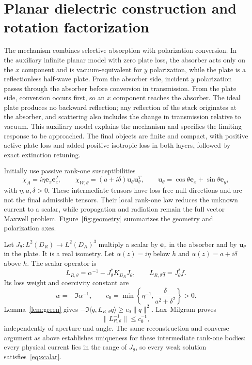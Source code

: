 \documentclass[11pt]{article}
\newcommand{\ey}{\mathbf e_y}
\newcommand{\ex}{\mathbf e_x}
\newcommand{\uvec}{\mathbf u_\theta}
\newcommand{\ip}[2]{\langle #1,#2\rangle}
\newcommand{\norm}[1]{\lVert #1\rVert}
\begin{document}
\section{Planar dielectric construction and rotation factorization}\label{sec:planar}
The mechanism combines selective absorption with polarization conversion. In the auxiliary infinite planar model with zero plate loss, the absorber acts only on the $x$ component and is vacuum-equivalent for $y$ polarization, while the plate is a reflectionless half-wave plate. From the absorber side, incident $y$ polarization passes through the absorber before conversion in transmission. From the plate side, conversion occurs first, so an $x$ component reaches the absorber. The ideal plate produces no backward reflection; any reflection of the stack originates at the absorber, and scattering also includes the change in transmission relative to vacuum. This auxiliary model explains the mechanism and specifies the limiting response to be approached. The final objects are finite and compact, with positive active plate loss and added positive isotropic loss in both layers, followed by exact extinction retuning.

Initially use passive rank-one susceptibilities
\begin{equation}\label{eq:rankone}
 \chi_A=i\eta\ex\ex^T,\qquad
 \chi_{W,\theta}=(a+i\delta)\uvec\uvec^T,\qquad
 \uvec=\cos\theta\ex+\sin\theta\ey,
\end{equation}
with $\eta,a,\delta>0$. These intermediate tensors have loss-free null directions and are not the final admissible tensors. Their local rank-one law reduces the unknown current to a scalar, while propagation and radiation remain the full vector Maxwell problem. Figure~\ref{fig:geometry} summarizes the geometry and polarization axes.

Let $J_\theta:L^2(D_R)\to L^2(D_R)^3$ multiply a scalar by $\ex$ in the absorber and by $\uvec$ in the plate. It is a real isometry. Let $\alpha(z)=i\eta$ below $h$ and $\alpha(z)=a+i\delta$ above $h$. The scalar operator is
\begin{equation}\label{eq:scalar}
 L_{R,\theta}=\alpha^{-1}-J_\theta^*K_{D_R}J_\theta,\qquad
 L_{R,\theta}q=J_\theta^*f.
\end{equation}
Its loss weight and coercivity constant are
\begin{equation}\label{eq:c0}
 w=-\Im\alpha^{-1},\qquad
 c_0=\min\left\{\eta^{-1},\frac{\delta}{a^2+\delta^2}\right\}>0.
\end{equation}
Lemma~\ref{lem:green} gives $-\Im\ip{q}{L_{R,\theta}q}\geq c_0\norm{q}^2$. Lax--Milgram proves
\begin{equation}\label{eq:scalar-inverse}
 \norm{L_{R,\theta}^{-1}}\leq c_0^{-1},
\end{equation}
independently of aperture and angle. The same reconstruction and converse argument as above establishes uniqueness for these intermediate rank-one bodies: every physical current lies in the range of $J_\theta$, so every weak solution satisfies~\eqref{eq:scalar}.
\end{document}
